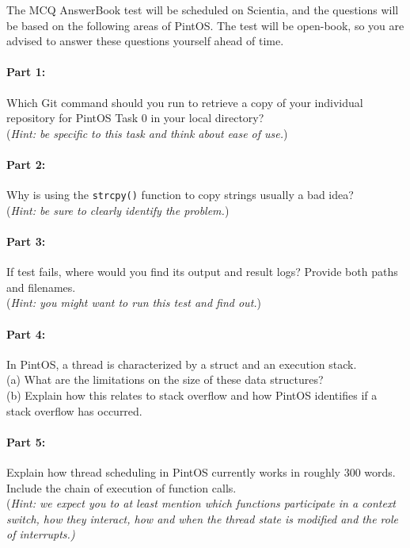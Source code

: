 \documentclass[a4paper,11pt]{article}
\begin{document}
The MCQ AnswerBook test will be scheduled on Scientia, and the questions will be based on the following areas of PintOS.
The test will be open-book, so you are advised to answer these questions yourself ahead of time.

\paragraph{Part 1:}
Which Git command should you run to retrieve a copy of your individual repository for PintOS Task 0 in your local directory? \\
(\textit{Hint: be specific to this task and think about ease of use.})

\paragraph{Part 2:}
Why is using the {\tt strcpy()} function to copy strings usually a bad idea? \\
(\textit{Hint: be sure to clearly identify the problem.})

\paragraph{Part 3:}
If test  fails, where would you find its output and result logs?
Provide both paths and filenames. \\
(\textit{Hint: you might want to run this test and find out.}) 
 
\paragraph{Part 4:}
In PintOS, a thread is characterized by a struct and an execution stack. \\
(a) What are the limitations on the size of these data structures? \\
(b) Explain how this relates to stack overflow and how PintOS identifies if a stack overflow has occurred.

\paragraph{Part 5:}
Explain how thread scheduling in PintOS currently works in roughly 300 words.
Include the chain of execution of function calls. \\
(\textit{Hint: we expect you to at least mention which functions participate in a context switch, how they interact, how and when the thread state is modified and the role of interrupts.)}
\end{document}
